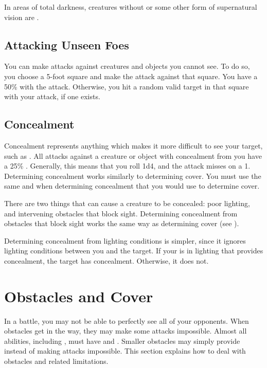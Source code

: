     In areas of total darkness, creatures without  or some other form of supernatural vision are \blinded.

    \subsection{Attacking Unseen Foes}
        You can make  attacks against creatures and objects you cannot see.
        To do so, you choose a 5-foot square and make the attack against that square.
        You have a 50\%  with the attack.
        Otherwise, you hit a random valid target in that square with your attack, if one exists.

    \subsection{Concealment}\label{Concealment}
        Concealment represents anything which makes it more difficult to see your target, such as .
        All  attacks against a creature or object with concealment from you have a 25\% .
        Generally, this means that you roll 1d4, and the attack misses on a 1.
        Determining concealment works similarly to determining cover.
        You must use the same  and  when determining concealment that you would use to determine cover.

         There are two things that can cause a creature to be concealed: poor lighting, and intervening obstacles that block sight.
        Determining concealment from obstacles that block sight works the same way as determining cover (see ).

        Determining concealment from lighting conditions is simpler, since it ignores lighting conditions between you and the target.
        If your  is in lighting that provides concealment, the target has concealment.
        Otherwise, it does not.

\section{Obstacles and Cover}\label{Obstacles and Cover}
    In a battle, you may not be able to perfectly see all of your opponents.
    When obstacles get in the way, they may make some attacks impossible.
    Almost all abilities, including , must have  and .
    Smaller obstacles may simply provide  instead of making attacks impossible.
    This section explains how to deal with obstacles and related limitations.

